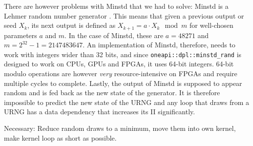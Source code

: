 
There are however problems with Minstd that we had to solve: Minstd is a Lehmer random number generator \cite{lehmer1951mathematical}. This means that given a previous output or seed $X_{k}$, its next output is defined as $X_{k+1} = a \cdot X_k \mod m$ for well-chosen parameters $a$ and $m$. In the case of Minstd, these are $a = 48271$ and $m = 2^{32} - 1 = 2147483647$. An implementation of Minstd, therefore, needs to work with integers wider than 32 bits, and since \texttt{oneapi::dpl::minstd\_rand} is designed to work on \acp{CPU}, \acp{GPU} and \acp{FPGA}, it uses 64-bit integers. 64-bit modulo operations are however \emph{very} resource-intensive on \acp{FPGA} and require multiple cycles to complete. Lastly, the output of Minstd is supposed to appear random and is fed back as the new state of the generator. It is therefore impossible to predict the new state of the \ac{URNG} and any loop that draws from a \ac{URNG} has a data dependency that increases its \ac{II} significantly. 

Necessary: Reduce random draws to a minimum, move them into own kernel, make kernel loop as short as possible.

